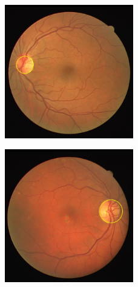 \documentclass{article}
\begin{document}
\subsection{}
\begin{figure}[H]
    \centering
    \includegraphics[width=0.5\textwidth]{figures/2.jpg}
    \caption
	{}
    \label{fig:fig1}
\end{figure}
\begin{figure}[H]
    \centering
    \includegraphics[width=0.5\textwidth]{figures/3.jpg}
    \caption
	{}
    \label{fig:fig1}
\end{figure}




%



\end{document}
